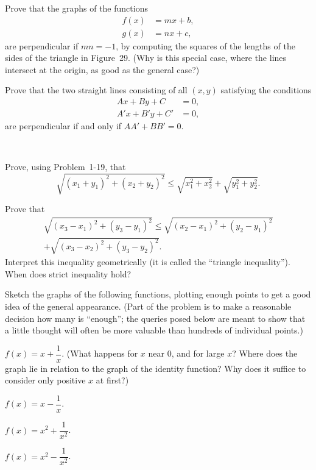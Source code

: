 \begin{letters}
\item Prove that the graphs of the functions
  \begin{align*}
  f(x)&=mx+b,\\
  g(x)&=nx+c,
  \end{align*}
  are perpendicular if $mn=-1$, by computing the squares of the lengths of the
  sides of the triangle in Figure~29. (Why is this special case, where the
  lines intersect at the origin, as good as the general case?)
\item Prove that the two straight lines consisting of all $(x,y)$ satisfying
  the conditions
  \begin{align*}
  Ax+By+C&=0,\\
  A'x+B'y+C'&=0,
  \end{align*}
  are perpendicular if and only if $AA'+BB'=0$.
\end{letters}

\begin{center}
\\[0.6em]
\end{center}

\begin{letters}
\item Prove, using Problem~1-19, that
  \[
  \sqrt{(x_1+y_1)^2+(x_2+y_2)^2}\leq\sqrt{x_1^2+x_2^2}+\sqrt{y_1^2+y_2^2}.
  \]
\item Prove that
  \begin{multline*}
  \sqrt{(x_3-x_1)^2+(y_3-y_1)^2}
  \leq\sqrt{(x_2-x_1)^2+(y_2-y_1)^2}\\
  +\sqrt{(x_3-x_2)^2+(y_3-y_2)^2}.
  \end{multline*}
  Interpret this inequality geometrically (it is called the ``triangle
  inequality''). When does strict inequality hold?
\end{letters}

 Sketch the graphs of the following functions, plotting enough points
to get a good idea of the general appearance. (Part of the problem is to make a
reasonable decision how many is ``enough''; the queries posed below are meant
to show that a little thought will often be more valuable than hundreds of
individual points.)
\begin{romans}
\item $f(x)=x+\dfrac1x$. (What happens for $x$ near $0$, and for large $x$?
  Where does the graph lie in relation to the graph of the identity function?
  Why does it suffice to consider only positive $x$ at first?)
\item $f(x)=x-\dfrac1x$.
\item $f(x)=x^2+\dfrac1{x^2}$.
\item $f(x)=x^2-\dfrac1{x^2}$.
\end{romans}

